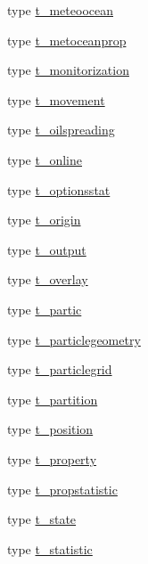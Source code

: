 \begin{DoxyCompactItemize}
\item 
type \mbox{\hyperlink{structmodulelagrangianglobal_1_1t__meteoocean}{t\+\_\+meteoocean}}
\item 
type \mbox{\hyperlink{structmodulelagrangianglobal_1_1t__metoceanprop}{t\+\_\+metoceanprop}}
\item 
type \mbox{\hyperlink{structmodulelagrangianglobal_1_1t__monitorization}{t\+\_\+monitorization}}
\item 
type \mbox{\hyperlink{structmodulelagrangianglobal_1_1t__movement}{t\+\_\+movement}}
\item 
type \mbox{\hyperlink{structmodulelagrangianglobal_1_1t__oilspreading}{t\+\_\+oilspreading}}
\item 
type \mbox{\hyperlink{structmodulelagrangianglobal_1_1t__online}{t\+\_\+online}}
\item 
type \mbox{\hyperlink{structmodulelagrangianglobal_1_1t__optionsstat}{t\+\_\+optionsstat}}
\item 
type \mbox{\hyperlink{structmodulelagrangianglobal_1_1t__origin}{t\+\_\+origin}}
\item 
type \mbox{\hyperlink{structmodulelagrangianglobal_1_1t__output}{t\+\_\+output}}
\item 
type \mbox{\hyperlink{structmodulelagrangianglobal_1_1t__overlay}{t\+\_\+overlay}}
\item 
type \mbox{\hyperlink{structmodulelagrangianglobal_1_1t__partic}{t\+\_\+partic}}
\item 
type \mbox{\hyperlink{structmodulelagrangianglobal_1_1t__particlegeometry}{t\+\_\+particlegeometry}}
\item 
type \mbox{\hyperlink{structmodulelagrangianglobal_1_1t__particlegrid}{t\+\_\+particlegrid}}
\item 
type \mbox{\hyperlink{structmodulelagrangianglobal_1_1t__partition}{t\+\_\+partition}}
\item 
type \mbox{\hyperlink{structmodulelagrangianglobal_1_1t__position}{t\+\_\+position}}
\item 
type \mbox{\hyperlink{structmodulelagrangianglobal_1_1t__property}{t\+\_\+property}}
\item 
type \mbox{\hyperlink{structmodulelagrangianglobal_1_1t__propstatistic}{t\+\_\+propstatistic}}
\item 
type \mbox{\hyperlink{structmodulelagrangianglobal_1_1t__state}{t\+\_\+state}}
\item 
type \mbox{\hyperlink{structmodulelagrangianglobal_1_1t__statistic}{t\+\_\+statistic}}
\end{DoxyCompactItemize}
